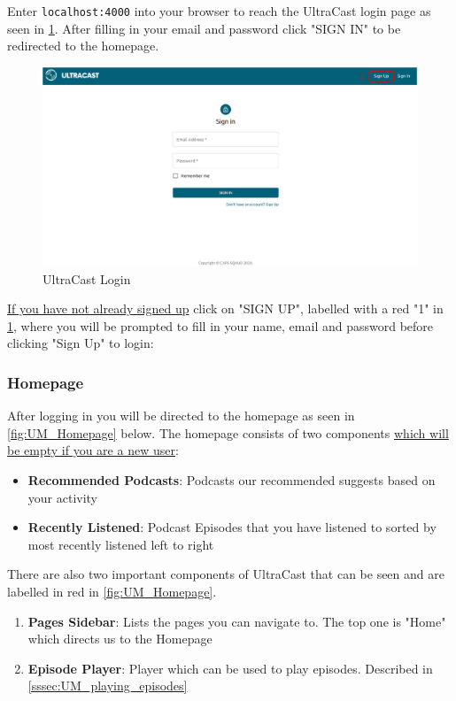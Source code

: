 \documentclass[../report.tex]{subfiles}
\begin{document}
Enter \verb|localhost:4000| into your browser to reach the UltraCast
login page as seen in \cref{fig:UM_Login}. After filling in your email and password 
click "SIGN IN" to be redirected to the homepage.
%
\begin{figure}[ht] 
    \centering
    \includegraphics[width=16cm]{resources/UM_Login}
    \caption{UltraCast Login}
    \label{fig:UM_Login} 
\end{figure}

\underline{If you have not already signed up} click on "SIGN UP", labelled with a red "1" in \cref{fig:UM_Login}, where
you will be prompted to fill in your name, email and password before clicking "Sign Up" to login:

\newpage

\subsubsection{Homepage}

After logging in you will be directed to the homepage as seen in \cref{fig:UM_Homepage} below. The 
homepage consists of two components \underline{which will be empty if you are a new user}:
%
\begin{itemize}
    \item \textbf{Recommended Podcasts}: Podcasts our recommended suggests based on your activity
    \item \textbf{Recently Listened}: Podcast Episodes that you have listened to sorted by most recently listened left to right
\end{itemize}
%
There are also two important components of UltraCast that can be seen and are labelled in red in \cref{fig:UM_Homepage}.
\begin{enumerate}
    \item \textbf{Pages Sidebar}: Lists the pages you can navigate to. The top one is "Home" which directs us to the Homepage
    \item \textbf{Episode Player}: Player which can be used to play episodes. Described in \cref{sssec:UM_playing_episodes}
\end{enumerate}
\end{document}
